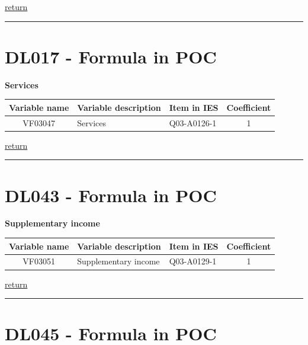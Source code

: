 \documentclass[]{book}
\begin{document}
\protect\hyperlink{b3.-profit-and-loss-statement-variables}{return}

\begin{center}\rule{0.5\linewidth}{\linethickness}\end{center}

\hypertarget{dl017---formula-in-poc}{%
\section{DL017 - Formula in POC}\label{dl017---formula-in-poc}}

\textbf{Services}

\begin{longtable}[]{@{}cllc@{}}
\toprule
Variable name & Variable description & Item in IES & Coefficient\tabularnewline
\midrule
\endhead
VF03047 & Services & Q03-A0126-1 & 1\tabularnewline
\bottomrule
\end{longtable}

\protect\hyperlink{b3.-profit-and-loss-statement-variables}{return}

\begin{center}\rule{0.5\linewidth}{\linethickness}\end{center}

\hypertarget{dl043---formula-in-poc}{%
\section{DL043 - Formula in POC}\label{dl043---formula-in-poc}}

\textbf{Supplementary income}

\begin{longtable}[]{@{}cllc@{}}
\toprule
Variable name & Variable description & Item in IES & Coefficient\tabularnewline
\midrule
\endhead
VF03051 & Supplementary income & Q03-A0129-1 & 1\tabularnewline
\bottomrule
\end{longtable}

\protect\hyperlink{b3.-profit-and-loss-statement-variables}{return}

\begin{center}\rule{0.5\linewidth}{\linethickness}\end{center}

\hypertarget{dl045---formula-in-poc}{%
\section{DL045 - Formula in POC}\label{dl045---formula-in-poc}}
\end{document}
